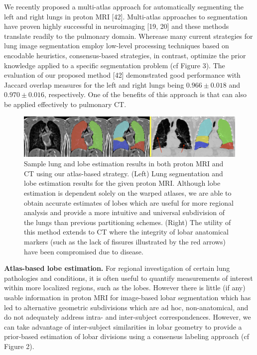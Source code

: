 \documentclass[11pt,]{article}
\begin{document}
We recently proposed a multi-atlas approach for automatically segmenting
the left and right lungs in proton MRI {[}42{]}. Multi-atlas approaches
to segmentation have proven highly successful in neuroimaging {[}19,
20{]} and these methods translate readily to the pulmonary domain.
Wherease many current strategies for lung image segmentation employ
low-level processing techniques based on encodable heuristics,
consensus-based strategies, in contrast, optimize the prior knowledge
applied to a specific segmentation problem (cf Figure 3). The evaluation
of our proposed method {[}42{]} demonstrated good performance with
Jaccard overlap measures for the left and right lungs being
$0.966 \pm 0.018$ and $0.970 \pm 0.016$, respectively. One of the
benefits of this approach is that can also be applied effectively to
pulmonary CT.

\begin{figure}[htbp]
\centering
\includegraphics{Figs/lungEstimation.png}
\caption{Sample lung and lobe estimation results in both proton MRI and
CT using our atlas-based strategy. (Left) Lung segmentation and lobe
estimation results for the given proton MRI. Although lobe estimation is
dependent solely on the warped atlases, we are able to obtain accurate
estimates of lobes which are useful for more regional analysis and
provide a more intuitive and universal subdivision of the lungs than
previous partitioning schemes. (Right) The utility of this method
extends to CT where the integrity of lobar anatomical markers (such as
the lack of fissures illustrated by the red arrows) have been
compromised due to disease.}
\end{figure}

\textbf{Atlas-based lobe estimation.} For regional investigation of
certain lung pathologies and conditions, it is often useful to quantify
measurements of interest within more localized regions, such as the
lobes. However there is little (if any) usable information in proton MRI
for image-based lobar segmentation which has led to alternative
geometric subdivisions which are ad hoc, non-anatomical, and do not
adequately address intra- and inter-subject correspondences. However, we
can take advantage of inter-subject similarities in lobar geometry to
provide a prior-based estimation of lobar divisions using a consensus
labeling approach (cf Figure 2).
\end{document}
